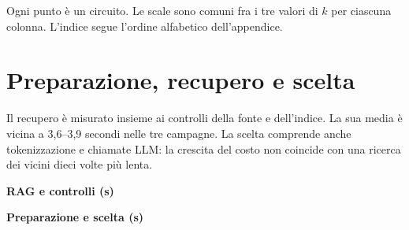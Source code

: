 \documentclass[a4paper,10pt]{article}
\begin{document}
{\small Ogni punto è un circuito. Le scale sono comuni fra i tre valori di $k$ per ciascuna colonna. L'indice segue l'ordine alfabetico dell'appendice.}\par
\clearpage\section{Preparazione, recupero e scelta}
Il recupero è misurato insieme ai controlli della fonte e dell'indice. La sua media è vicina a 3,6--3,9 secondi nelle tre campagne. La scelta comprende anche tokenizzazione e chiamate LLM: la crescita del costo non coincide con una ricerca dei vicini dieci volte più lenta.\par\medskip
\noindent\begin{minipage}{.49\linewidth}\centering\textbf{RAG e controlli (s)}\end{minipage}\hfill\begin{minipage}{.49\linewidth}\centering\textbf{Preparazione e scelta (s)}\end{minipage}\par
\end{document}
